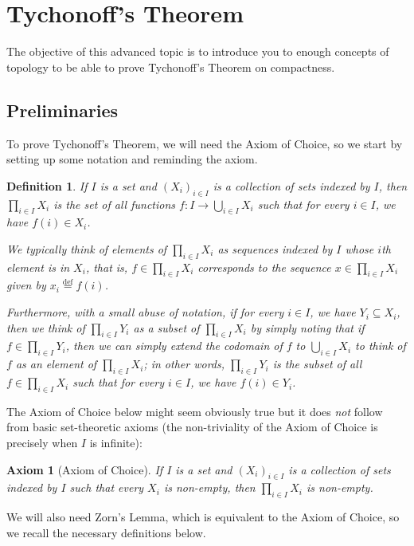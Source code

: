 \documentclass[12pt]{article}
\theoremstyle{bigskipthmstyle}
\theoremstyle{thmstyle}
\newtheorem{axiom}[theorem]{Axiom}
\theoremstyle{plainstyle}
\newtheorem{definition}[theorem]{Definition}
\newcommand{\df}{\stackrel{\text{def}}{=}}
\begin{document}
\section{Tychonoff's Theorem}

The objective of this advanced topic is to introduce you to enough concepts of topology to be able
to prove Tychonoff's Theorem on compactness.

\subsection{Preliminaries}

To prove Tychonoff's Theorem, we will need the Axiom of Choice, so we start by setting up some
notation and reminding the axiom.
\begin{definition}
  If $I$ is a set and $(X_i)_{i\in I}$ is a collection of sets indexed by $I$, then $\prod_{i\in I}
  X_i$ is the set of all functions $f\colon I\to\bigcup_{i\in I} X_i$ such that for every $i\in I$,
  we have $f(i)\in X_i$.

  We typically think of elements of $\prod_{i\in I} X_i$ as sequences indexed by $I$ whose $i$th
  element is in $X_i$, that is, $f\in\prod_{i\in I} X_i$ corresponds to the sequence
  $x\in\prod_{i\in I} X_i$ given by $x_i\df f(i)$.

  Furthermore, with a small abuse of notation, if for every $i\in I$, we have $Y_i\subseteq X_i$,
  then we think of $\prod_{i\in I} Y_i$ as a subset of $\prod_{i\in I} X_i$ by simply noting that if
  $f\in\prod_{i\in I} Y_i$, then we can simply extend the codomain of $f$ to $\bigcup_{i\in I} X_i$
  to think of $f$ as an element of $\prod_{i\in I} X_i$; in other words, $\prod_{i\in I} Y_i$ is the
  subset of all $f\in\prod_{i\in I} X_i$ such that for every $i\in I$, we have $f(i)\in Y_i$.
\end{definition}

The Axiom of Choice below might seem obviously true but it does \emph{not} follow from basic
set-theoretic axioms (the non-triviality of the Axiom of Choice is precisely when $I$ is infinite):
\begin{axiom}[Axiom of Choice]
  If $I$ is a set and $(X_i)_{i\in I}$ is a collection of sets indexed by $I$ such that every $X_i$
  is non-empty, then $\prod_{i\in I} X_i$ is non-empty.
\end{axiom}

We will also need Zorn's Lemma, which is equivalent to the Axiom of Choice, so we recall the
necessary definitions below.
\end{document}
